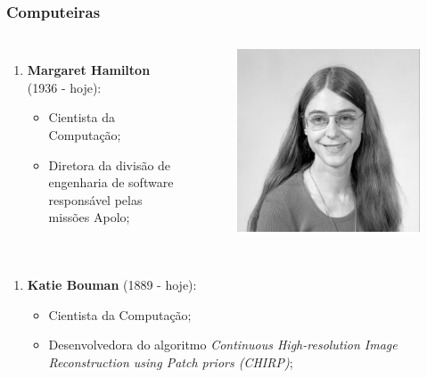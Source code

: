 \documentclass[11pt, brazil]{beamer}
\begin{document}
\begin{frame}
\frametitle{Computeiras}
\begin{columns}
\begin{enumerate}
 \justifying
 \item {\color{crimson}\bf Margaret Hamilton} (1936 - hoje):
  \begin{itemize}
   \justifying
   \item Cientista da Computação;
   \item Diretora da divisão de engenharia de software responsável pelas missões Apolo;
  \end{itemize}
\end{enumerate}
\begin{figure}
 \includegraphics[scale=0.13]{figuras/hamilton.jpg}
\end{figure}
\end{columns}
\pause  
\begin{columns}
\begin{enumerate}
 \justifying
 \item {\color{crimson}\bf Katie Bouman} (1889 - hoje):
  \begin{itemize}
   \justifying
   \item Cientista da Computação;
   \item Desenvolvedora do algoritmo {\em Continuous High-resolution Image Reconstruction using Patch priors (CHIRP)};

\end{itemize}
\end{enumerate}
\end{columns}
\end{frame}
\end{document}
